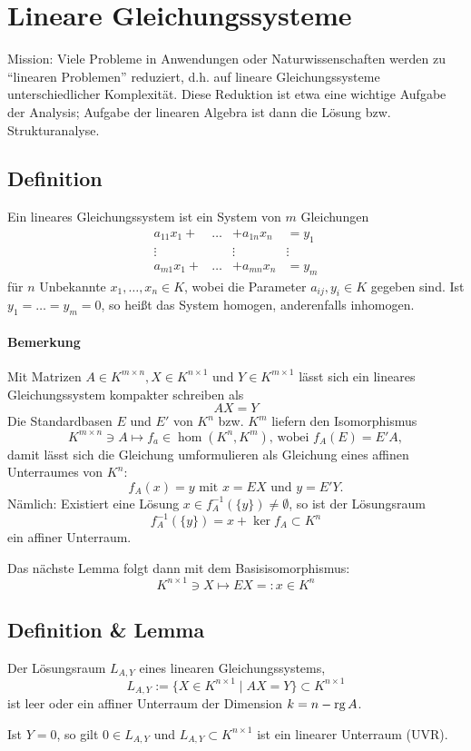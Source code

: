 \section{Lineare Gleichungssysteme}
	Mission: Viele Probleme in Anwendungen oder Naturwissenschaften werden zu "`linearen Problemen"' reduziert, d.h. auf lineare Gleichungssysteme unterschiedlicher Komplexität.
	Diese Reduktion ist etwa eine wichtige Aufgabe der Analysis; Aufgabe der linearen Algebra ist dann die Lösung bzw. Strukturanalyse.
\subsection{Definition}
	\begin{Definition}
	Ein lineares Gleichungssystem ist ein System von $ m $ Gleichungen
		\[ \begin{array}{cccc}
		a_{11}x_1+&\dots &+ a_{1n}x_n &=y_1\\
		\vdots & &\vdots & \vdots\\
		a_{m1}x_1 +& \dots &+a_{mn}x_n &= y_m
		\end{array} \]
	für $ n $ Unbekannte $ x_1,\dots,x_n\in K $, wobei die Parameter $ a_{ij},y_i\in K $ gegeben sind. Ist $ y_1 = \dots = y_m = 0 $, so heißt das System homogen, anderenfalls inhomogen.
	\end{Definition}
\paragraph{Bemerkung}
	Mit Matrizen $ A\in K^{m\times n},X\in K^{n\times 1} $ und $ Y\in K^{m\times 1} $ lässt sich ein lineares Gleichungssystem kompakter schreiben als
		\[ AX = Y \]
	Die Standardbasen $ E $ und $ E' $ von $ K^n $ bzw. $ K^m $ liefern den Isomorphismus
		\[ K^{m\times n}\ni A\mapsto f_a\in \hom(K^n,K^m)\text{, wobei }f_A(E) = E'A, \]
	damit lässt sich die Gleichung umformulieren als Gleichung eines affinen Unterraumes von $ K^n: $
		\[ f_A(x) = y \text{ mit } x=EX \text{ und } y=E'Y. \]
	Nämlich: Existiert eine Lösung $ x\in f_A^{-1}(\{y\})\neq \emptyset $, so ist der Lösungsraum
		\[ f_A^{-1}(\{y\}) = x+\ker f_A\subset K^n \]
	ein affiner Unterraum.
	
	Das nächste Lemma folgt dann mit dem Basisisomorphismus:
		\[ K^{n\times 1} \ni X \mapsto EX =: x\in K^n \]
\subsection{Definition \& Lemma}
	\begin{Lemma}[Lösungsraum]
	Der Lösungsraum $ L_{A,Y} $ eines linearen Gleichungssystems,
		\[ L_{A,Y}:=\{X\in K^{n\times 1}\mid AX=Y\}\subset K^{n\times 1} \]
	ist leer oder ein affiner Unterraum der Dimension $ k = n-\operatorname{rg} A $.
	
	Ist $ Y = 0 $, so gilt $ 0\in L_{A,Y} $ und $ L_{A,Y}\subset K^{n\times 1} $ ist ein linearer Unterraum (UVR).
	\end{Lemma}